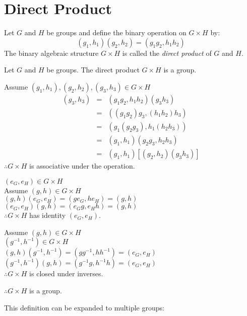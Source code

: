\documentclass[letterpaper,12pt,fleqn]{article}
\begin{document}
\section*{Direct Product}

\begin{definition}
  Let $G$ and $H$ be groups and define the binary operation on $G\times H$ by:
  \[(g_1,h_1)(g_2,h_2)=(g_1g_2,h_1h_2)\]
  The binary algebraic structure $G\times H$ is called the
  \emph{direct product} of $G$ and $H$.
\end{definition}

\begin{theorem}
  Let $G$ and $H$ be groups. The direct product $G\times H$ is a group.
\end{theorem}

\begin{theproof}
  Assume $(g_1,h_1),(g_2,h_2),(g_3,h_3)\in G\times H$ \\
  \begin{eqnarray*}
    [(g_1,h_1)(g_2,h_2)](g_3,h_3) &=& (g_1g_2,h_1h_2)(g_3h_3) \\
    &=& ((g_1g_2)g_3,(h_1h_2)h_3) \\
    &=& (g_1(g_2g_3),h_1(h_2h_3)) \\
    &=& (g_1,h_1)(g_2g_3,h_2h_3) \\
    &=& (g_1,h_1)[(g_2,h_2)(g_3h_3)]
  \end{eqnarray*}
  $\therefore G\times H$ is associative under the operation.

  $(e_G,e_H)\in G\times H$ \\
  Assume $(g,h)\in G\times H$ \\
  $(g,h)(e_G,e_H)=(ge_G,he_H)=(g,h)$ \\
  $(e_G,e_H)(g,h)=(e_Gg,e_Hh)=(g,h)$ \\
  $\therefore G\times H$ has identity $(e_G,e_H)$.

  Assume $(g,h)\in G\times H$ \\
  $(g^{-1},h^{-1})\in G\times H$ \\
  $(g,h)(g^{-1},h^{-1})=(gg^{-1},hh^{-1})=(e_G,e_H)$ \\
  $(g^{-1},h^{-1})(g,h)=(g^{-1}g,h^{-1}h)=(e_G,e_H)$ \\
  $\therefore G\times H$ is closed under inverses.

  $\therefore G\times H$ is a group.
\end{theproof}

This definition can be expanded to multiple groups:
\end{document}

